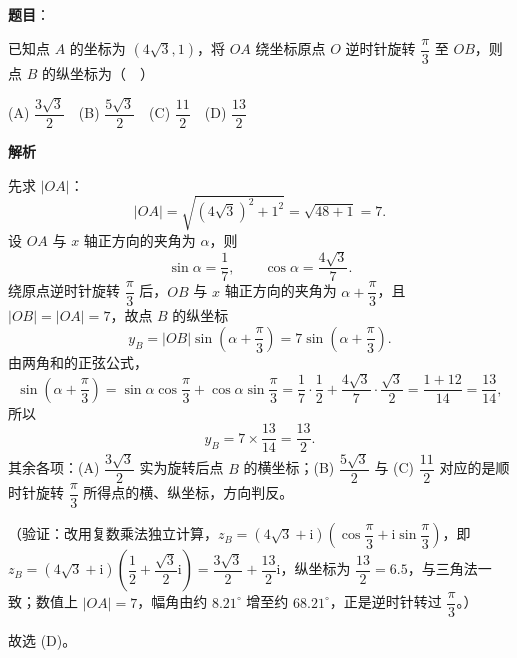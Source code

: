 \begin{answer}

\textbf{题目}：

已知点 \(A\) 的坐标为 \((4\sqrt{3},1)\)，将 \(OA\) 绕坐标原点 \(O\) 逆时针旋转 \(\dfrac{\pi}{3}\) 至 \(OB\)，则点 \(B\) 的纵坐标为（　）

(A) \(\dfrac{3\sqrt{3}}{2}\)　(B) \(\dfrac{5\sqrt{3}}{2}\)　(C) \(\dfrac{11}{2}\)　(D) \(\dfrac{13}{2}\)

\textbf{解析}

先求 \(|OA|\)：
\nopagebreak[4]
\[
|OA|=\sqrt{(4\sqrt{3})^{2}+1^{2}}=\sqrt{48+1}=7.
\]
设 \(OA\) 与 \(x\) 轴正方向的夹角为 \(\alpha\)，则
\nopagebreak[4]
\[
\sin\alpha=\frac{1}{7},\qquad\cos\alpha=\frac{4\sqrt{3}}{7}.
\]
绕原点逆时针旋转 \(\dfrac{\pi}{3}\) 后，\(OB\) 与 \(x\) 轴正方向的夹角为 \(\alpha+\dfrac{\pi}{3}\)，且 \(|OB|=|OA|=7\)，故点 \(B\) 的纵坐标
\nopagebreak[4]
\[
y_{B}=|OB|\sin\left(\alpha+\frac{\pi}{3}\right)=7\sin\left(\alpha+\frac{\pi}{3}\right).
\]
由两角和的正弦公式，
\nopagebreak[4]
\[
\sin\left(\alpha+\frac{\pi}{3}\right)=\sin\alpha\cos\frac{\pi}{3}+\cos\alpha\sin\frac{\pi}{3}
=\frac{1}{7}\cdot\frac{1}{2}+\frac{4\sqrt{3}}{7}\cdot\frac{\sqrt{3}}{2}
=\frac{1+12}{14}=\frac{13}{14},
\]
所以
\nopagebreak[4]
\[
y_{B}=7\times\frac{13}{14}=\frac{13}{2}.
\]
其余各项：(A) \(\dfrac{3\sqrt{3}}{2}\) 实为旋转后点 \(B\) 的横坐标；(B) \(\dfrac{5\sqrt{3}}{2}\) 与 (C) \(\dfrac{11}{2}\) 对应的是顺时针旋转 \(\dfrac{\pi}{3}\) 所得点的横、纵坐标，方向判反。

（验证：改用复数乘法独立计算，\(z_{B}=\left(4\sqrt{3}+\mathrm{i}\right)\allowbreak\left(\cos\dfrac{\pi}{3}+\mathrm{i}\sin\dfrac{\pi}{3}\right)\)，即 \(z_{B}=\left(4\sqrt{3}+\mathrm{i}\right)\allowbreak\left(\dfrac{1}{2}+\dfrac{\sqrt{3}}{2}\mathrm{i}\right)=\dfrac{3\sqrt{3}}{2}+\dfrac{13}{2}\mathrm{i}\)，纵坐标为 \(\dfrac{13}{2}=6.5\)，与三角法一致；数值上 \(|OA|=7\)，幅角由约 \(8.21^{\circ}\) 增至约 \(68.21^{\circ}\)，正是逆时针转过 \(\dfrac{\pi}{3}\)。）

故选 (D)。


\end{answer}

